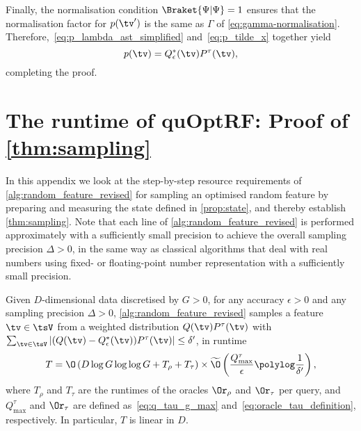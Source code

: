 Finally, the normalisation condition $\Braket{\Psi|\Psi}=1$ ensures that the normalisation factor for $p(\tv')$ is the same as $\Gamma$ of \cref{eq:gamma-normalisation}. Therefore,~\cref{eq:p_lambda_ast_simplified} and~\cref{eq:p_tilde_x} together yield
\begin{equation}
  p(\tv)=
  Q_{\epsilon}^\ast (\tv)P^{\tau} (\tv),
\end{equation}
completing the proof.


\setcounter{equation}{0}
\section{The runtime of quOptRF: Proof of \texorpdfstring{\cref{thm:sampling}}{Theorem 4.3}}
\label{app:featureSamp_sampling}

In this appendix we look at the step-by-step resource requirements of \cref{alg:random_feature_revised} for sampling an optimised random feature by preparing and measuring the state defined in \cref{prop:state}, and thereby establish \cref{thm:sampling}.
Note that each line of \cref{alg:random_feature_revised} is performed approximately with a sufficiently small precision to achieve the overall sampling precision $\Delta>0$, in the same way as classical algorithms that deal with real numbers using fixed- or floating-point number representation with a sufficiently small precision.

{
\begin{theorem*}
  Given $D$-dimensional data discretised by $G>0$,
  for any accuracy ${\epsilon}>0$
  and any sampling precision $\Delta>0$,
  \cref{alg:random_feature_revised} samples a feature $\tv  \in\tsV $ from a weighted distribution $Q(\tv)P^{\tau}(\tv)$ with
  $\sum_{\tv  \in\tsV }{|(Q(\tv)-Q_\epsilon^\ast(\tv))P^{\tau}(\tv)|}\leq\delta'$,
  in runtime
  \begin{align*}
    T=\O\left(D\log G \log\log G +T_\rho+T_\tau\right)\times\widetilde{\O}\left(\frac{Q_{\max}^{\tau}}{\epsilon} \polylog\frac{1}{\delta'}\right),
  \end{align*}
  where $T_\rho$ and $T_\tau$ are the runtimes of the oracles $\Or_\rho$ and $\Or_\tau$ per query, and $Q_{\max}^{\tau}$ and $\Or_\tau$ are defined as~\cref{eq:q_tau_g_max} and~\cref{eq:oracle_tau_definition}, respectively. In particular, $T$ is linear in $D$.
\end{theorem*}
}

